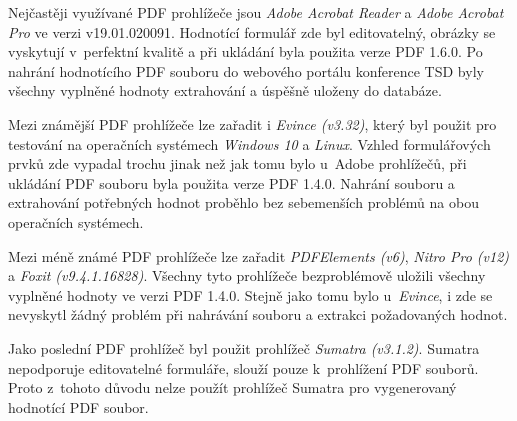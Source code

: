 \par
Nejčastěji využívané PDF prohlížeče jsou \textit{Adobe Acrobat Reader} a \textit{Adobe Acrobat Pro} ve verzi v19.01.020091. Hodnotící formulář zde byl editovatelný, obrázky se vyskytují v~perfektní kvalitě a při ukládání byla použita verze PDF 1.6.0. Po nahrání hodnotícího PDF souboru do webového portálu konference TSD byly všechny vyplněné hodnoty extrahování a úspěšně uloženy do databáze.
\par
Mezi známější PDF prohlížeče lze zařadit i \textit{Evince (v3.32)}, který byl použit pro testování na operačních systémech \textit{Windows 10} a \textit{Linux}. Vzhled formulářových prvků zde vypadal trochu jinak než jak tomu bylo u~Adobe prohlížečů, při ukládání PDF souboru byla použita verze PDF 1.4.0. Nahrání souboru a extrahování potřebných hodnot proběhlo bez sebemenších problémů na obou operačních systémech.
\par
Mezi méně známé PDF prohlížeče lze zařadit \textit{PDFElements (v6)}, \textit{Nitro Pro (v12)} a \textit{Foxit (v9.4.1.16828)}. Všechny tyto prohlížeče bezproblémově uložili všechny vyplněné hodnoty ve verzi PDF 1.4.0. Stejně jako tomu bylo u~\textit{Evince}, i zde se nevyskytl žádný problém při nahrávání souboru a extrakci požadovaných hodnot.
\par
Jako poslední PDF prohlížeč byl použit prohlížeč \textit{Sumatra (v3.1.2)}. Sumatra nepodporuje editovatelné formuláře, slouží pouze k~prohlížení PDF souborů. Proto z~tohoto důvodu nelze použít prohlížeč Sumatra pro vygenerovaný hodnotící PDF soubor.

